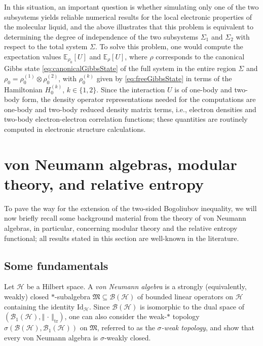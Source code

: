 \documentclass[a4paper, twoside, 11pt, reqno]{amsart}
\theoremstyle{definition}
\theoremstyle{plain}
\renewcommand{\subset}{\subseteq}
\renewcommand{\Sigma}{\varSigma}
\newcommand{\MH}{\mathcal{H}}
\newcommand{\MFM}{\mathfrak{M}}
\newcommand{\BO}{\mathscr{B}}
\newcommand{\NO}{\BO_1}
\newcommand{\id}{\mathrm{Id}}
\newcommand{\1}{\mathbf{1}}
\newcommand{\EV}{\mathbb{E}}
\newcommand{\set}[2][]{#1\{{#2}#1\}}
\newcommand{\norm}[2][]{#1\Vert{#2}#1\Vert}
\newcommand{\ndot}{\norm{\,\cdot\,}}
\begin{document}
In this situation, an important question is whether simulating only one of the two subsystems yields reliable numerical results for the local electronic properties of the molecular liquid, and the above illustrates that this problem is equivalent to determining the degree of independence of the two subsystems $\Sigma_1$ and $\Sigma_2$ with respect to the total system $\Sigma$. To solve this problem, one would compute the expectation values $\EV_{\rho_0}[U]$ and $\EV_{\rho}[U]$, where $\rho$ corresponds to the canonical Gibbs state \eqref{eq:canonicalGibbsState} of the full system in the entire region $\Sigma$ and $\rho_0 = \rho_{0}^{(1)} \otimes \rho_{0}^{(2)}$, with $\rho_{0}^{(k)}$ given by \eqref{eq:freeGibbsState} in terms of the Hamiltonian $H_0^{(k)}$, $k \in \set{1, 2}$. Since the interaction $U$ is of one-body and two-body form, the density operator representations needed for the computations are one-body and two-body reduced density matrix terms, i.e., electron densities and two-body electron-electron correlation functions; these quantities are routinely computed in electronic structure calculations.



\section{von Neumann algebras, modular theory, and relative entropy}\label{sec:vonNeumann}

To pave the way for the extension of the two-sided Bogoliubov inequality, we will now briefly recall some background material from the theory of von Neumann algebras, in particular, concerning modular theory and the relative entropy functional; all results stated in this section are well-known in the literature.


\subsection{Some fundamentals}\label{subsec:vonNeumann}

Let $\MH$ be a Hilbert space. A \emph{von Neumann algebra} is a strongly (equivalently, weakly) closed $\ast$-subalgebra $\MFM \subset \BO(\MH)$ of bounded linear operators on $\MH$ containing the identity $\id_\MH$. Since $\BO(\MH)$ is isomorphic to the dual space of $(\NO(\MH), \ndot_\mathrm{tr})$, one can also consider the weak-$\ast$ topology $\sigma (\BO(\MH), \NO(\MH))$ on $\MFM$, referred to as the \emph{$\sigma$-weak topology}, and show that every von Neumann algebra is $\sigma$-weakly closed.
\end{document}
